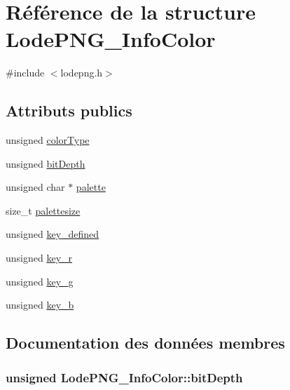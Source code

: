 \hypertarget{struct_lode_p_n_g___info_color}{}\section{Référence de la structure Lode\+P\+N\+G\+\_\+\+Info\+Color}
\label{struct_lode_p_n_g___info_color}


{\ttfamily \#include $<$lodepng.\+h$>$}

\subsection*{Attributs publics}
\begin{DoxyCompactItemize}
\item 
unsigned \hyperlink{struct_lode_p_n_g___info_color_a4ed18d179c5078137a18e742b1c41a00}{color\+Type}
\item 
unsigned \hyperlink{struct_lode_p_n_g___info_color_a9d538965a46d59bbdea744da8b290591}{bit\+Depth}
\item 
unsigned char $\ast$ \hyperlink{struct_lode_p_n_g___info_color_ac6de7ff58cb1f39a73567abb826f72f5}{palette}
\item 
size\+\_\+t \hyperlink{struct_lode_p_n_g___info_color_a49842a304ffd0abc8aa791030c5fa5dd}{palettesize}
\item 
unsigned \hyperlink{struct_lode_p_n_g___info_color_aa0193ce13025c776a0dfb1e6d1bed14a}{key\+\_\+defined}
\item 
unsigned \hyperlink{struct_lode_p_n_g___info_color_a5536a8859201cd11df789ec7ad8263df}{key\+\_\+r}
\item 
unsigned \hyperlink{struct_lode_p_n_g___info_color_a44bf4906335328972acebd6c8b83a073}{key\+\_\+g}
\item 
unsigned \hyperlink{struct_lode_p_n_g___info_color_a9f99cc5b4366f1eed325d13b4f191560}{key\+\_\+b}
\end{DoxyCompactItemize}


\subsection{Documentation des données membres}
\hypertarget{struct_lode_p_n_g___info_color_a9d538965a46d59bbdea744da8b290591}{}
\subsubsection[{bit\+Depth}]{\setlength{\rightskip}{0pt plus 5cm}unsigned Lode\+P\+N\+G\+\_\+\+Info\+Color\+::bit\+Depth}\label{struct_lode_p_n_g___info_color_a9d538965a46d59bbdea744da8b290591}
\hypertarget{struct_lode_p_n_g___info_color_a4ed18d179c5078137a18e742b1c41a00}{}
